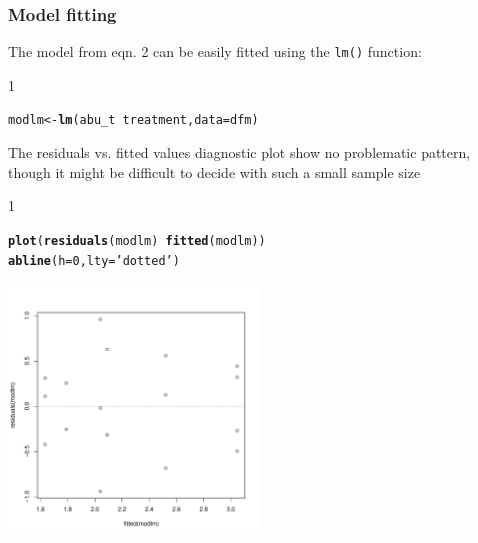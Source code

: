 \documentclass{scrartcl}\usepackage[]{graphicx}\usepackage[]{color}
\makeatletter
\newcommand{\hlnum}[1]{\textcolor[rgb]{0.686,0.059,0.569}{#1}}%
\newcommand{\hlstr}[1]{\textcolor[rgb]{0.192,0.494,0.8}{#1}}%
\newcommand{\hlopt}[1]{\textcolor[rgb]{0,0,0}{#1}}%
\newcommand{\hlstd}[1]{\textcolor[rgb]{0.345,0.345,0.345}{#1}}%
\newcommand{\hlkwb}[1]{\textcolor[rgb]{0.69,0.353,0.396}{#1}}%
\newcommand{\hlkwc}[1]{\textcolor[rgb]{0.333,0.667,0.333}{#1}}%
\newcommand{\hlkwd}[1]{\textcolor[rgb]{0.737,0.353,0.396}{\textbf{#1}}}%
\newenvironment{kframe}{%
 \def\at@end@of@kframe{}%
 \ifinner\ifhmode%
  \def\at@end@of@kframe{\end{minipage}}%
  \begin{minipage}{\columnwidth}%
 \fi\fi%
 \def\FrameCommand##1{\hskip\@totalleftmargin \hskip-\fboxsep
 \colorbox{shadecolor}{##1}\hskip-\fboxsep
     \hskip-\linewidth \hskip-\@totalleftmargin \hskip\columnwidth}%
 \MakeFramed {\advance\hsize-\width
   \@totalleftmargin\z@ \linewidth\hsize
   \@setminipage}}%
 {\par\unskip\endMakeFramed%
 \at@end@of@kframe}
\newenvironment{knitrout}{}{} %
\renewenvironment{knitrout}{\begin{spacing}{1}}{\end{spacing}}
\makeatother
\begin{document}
\subsubsection{Model fitting}
The model from eqn. 2 can be easily fitted using the \texttt{lm()} function:

\begin{knitrout}
\color{fgcolor}\begin{kframe}
\begin{alltt}
\hlstd{modlm} \hlkwb{<-} \hlkwd{lm}\hlstd{(abu_t} \hlopt{~} \hlstd{treatment,} \hlkwc{data} \hlstd{= dfm)}
\end{alltt}
\end{kframe}
\end{knitrout}

The residuals vs. fitted values diagnostic plot show no problematic pattern, though it might be difficult to decide with such a small sample size
\begin{knitrout}
\color{fgcolor}\begin{kframe}
\begin{alltt}
\hlkwd{plot}\hlstd{(}\hlkwd{residuals}\hlstd{(modlm)} \hlopt{~} \hlkwd{fitted}\hlstd{(modlm))}
\hlkwd{abline}\hlstd{(}\hlkwc{h} \hlstd{=} \hlnum{0}\hlstd{,} \hlkwc{lty} \hlstd{=} \hlstr{'dotted'}\hlstd{)}
\end{alltt}
\end{kframe}

{\centering \includegraphics[width=0.5\textwidth]{figure/plot_modlm-1} 

}



\end{knitrout}
\end{document}
